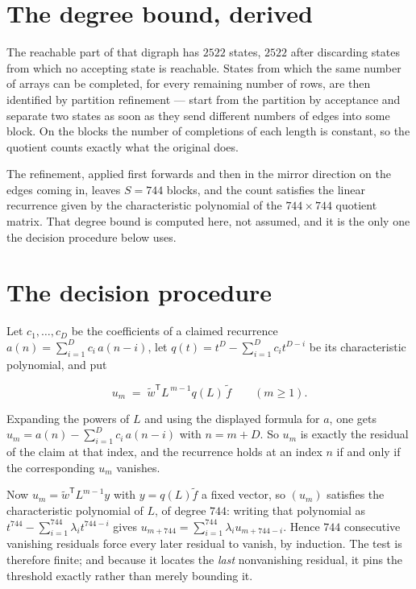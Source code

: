 \documentclass[11pt]{article}
\theoremstyle{definition}
\begin{document}
\section{The degree bound, derived}

The reachable part of that digraph has $2522$ states, $2522$ after discarding states from which no accepting state is reachable. States from which the same number of arrays can be completed, for every remaining number of rows, are then identified by partition refinement --- start from the partition by acceptance and separate two states as soon as they send different numbers of edges into some block. On the blocks the number of completions of each length is constant, so the quotient counts exactly what the original does.

The refinement, applied first forwards and then in the mirror direction on the edges coming in, leaves $S = 744$ blocks, and the count satisfies the linear recurrence given by the characteristic polynomial of the $744 \times 744$ quotient matrix. That degree bound is computed here, not assumed, and it is the only one the decision procedure below uses.

\section{The decision procedure}

Let $c_1,\dots,c_D$ be the coefficients of a claimed recurrence $a(n) = \sum_{i=1}^{D} c_i\,a(n-i)$, let $q(t) = t^{D} - \sum_{i=1}^{D} c_i t^{D-i}$ be its characteristic polynomial, and put

\[u_m \;=\; \tilde w^{\mathsf T} L^{\,m-1} q(L)\,\tilde f \qquad (m \ge 1).\]

Expanding the powers of $L$ and using the displayed formula for $a$, one gets $u_m = a(n) - \sum_{i=1}^{D} c_i\,a(n-i)$ with $n = m + D$. So $u_m$ is exactly the residual of the claim at that index, and the recurrence holds at an index $n$ if and only if the corresponding $u_m$ vanishes.

Now $u_m = \tilde w^{\mathsf T} L^{m-1} y$ with $y = q(L)\tilde f$ a fixed vector, so $(u_m)$ satisfies the characteristic polynomial of $L$, of degree $744$: writing that polynomial as $t^{744} - \sum_{i=1}^{744} \lambda_i t^{744-i}$ gives $u_{m+744} = \sum_{i=1}^{744} \lambda_i u_{m+744-i}$. Hence $744$ consecutive vanishing residuals force every later residual to vanish, by induction. The test is therefore finite; and because it locates the {\itshape last} nonvanishing residual, it pins the threshold exactly rather than merely bounding it.
\end{document}
